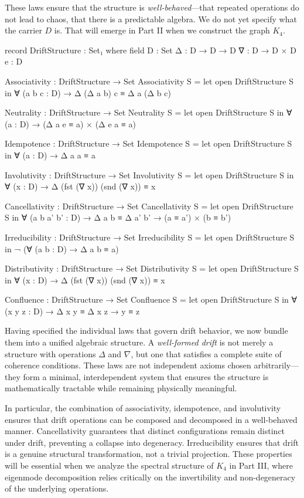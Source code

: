 \documentclass[11pt,a4paper]{book}
\begin{document}
These laws ensure that the structure is \emph{well-behaved}—that repeated operations 
do not lead to chaos, that there is a predictable algebra. We do not yet specify 
what the carrier $D$ is. That will emerge in Part II when we construct the graph $K_4$.

\begin{code}
record DriftStructure : Set₁ where
  field
    D : Set
    Δ : D → D → D
    ∇ : D → D × D
    e : D

Associativity : DriftStructure → Set
Associativity S = let open DriftStructure S in
  ∀ (a b c : D) → Δ (Δ a b) c ≡ Δ a (Δ b c)

Neutrality : DriftStructure → Set
Neutrality S = let open DriftStructure S in
  ∀ (a : D) → (Δ a e ≡ a) × (Δ e a ≡ a)

Idempotence : DriftStructure → Set
Idempotence S = let open DriftStructure S in
  ∀ (a : D) → Δ a a ≡ a

Involutivity : DriftStructure → Set
Involutivity S = let open DriftStructure S in
  ∀ (x : D) → Δ (fst (∇ x)) (snd (∇ x)) ≡ x

Cancellativity : DriftStructure → Set
Cancellativity S = let open DriftStructure S in
  ∀ (a b a' b' : D) → Δ a b ≡ Δ a' b' → (a ≡ a') × (b ≡ b')

Irreducibility : DriftStructure → Set
Irreducibility S = let open DriftStructure S in
  ¬ (∀ (a b : D) → Δ a b ≡ a)

Distributivity : DriftStructure → Set
Distributivity S = let open DriftStructure S in
  ∀ (x : D) → Δ (fst (∇ x)) (snd (∇ x)) ≡ x

Confluence : DriftStructure → Set
Confluence S = let open DriftStructure S in
  ∀ (x y z : D) → Δ x y ≡ Δ x z → y ≡ z
\end{code}

Having specified the individual laws that govern drift behavior, we now bundle them into a unified algebraic structure. A \emph{well-formed drift} is not merely a structure with operations $\Delta$ and $\nabla$, but one that satisfies a complete suite of coherence conditions. These laws are not independent axioms chosen arbitrarily—they form a minimal, interdependent system that ensures the structure is mathematically tractable while remaining physically meaningful.

In particular, the combination of associativity, idempotence, and involutivity ensures that drift operations can be composed and decomposed in a well-behaved manner. Cancellativity guarantees that distinct configurations remain distinct under drift, preventing a collapse into degeneracy. Irreducibility ensures that drift is a genuine structural transformation, not a trivial projection. These properties will be essential when we analyze the spectral structure of $K_4$ in Part III, where eigenmode decomposition relies critically on the invertibility and non-degeneracy of the underlying operations.
\end{document}
